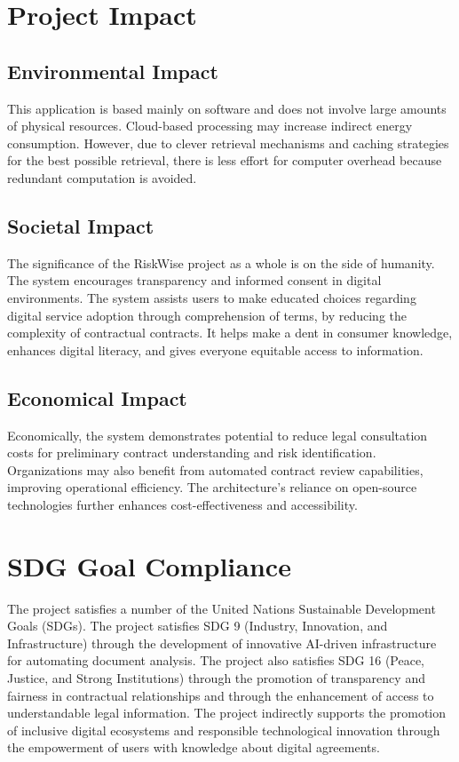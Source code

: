 \section{Project Impact}

\subsection{Environmental Impact}
This application is based mainly on software and does not involve
large amounts of physical resources. Cloud-based processing may
increase indirect energy consumption. However, due to clever
retrieval mechanisms and caching strategies for the best possible
retrieval, there is less effort for computer overhead because
redundant computation is avoided.

\subsection{Societal Impact}
The significance of the RiskWise project as a whole is on the side of
humanity. The system encourages transparency and informed consent in
digital environments. The system assists users to make educated
choices regarding digital service adoption through comprehension of
terms, by reducing the complexity of contractual contracts. It helps
make a dent in consumer knowledge, enhances digital literacy, and
gives everyone equitable access to information.

\subsection{Economical Impact}
Economically, the system demonstrates potential to reduce legal
consultation costs for preliminary contract understanding and risk
identification. Organizations may also benefit from automated
contract review capabilities, improving operational efficiency. The
architecture’s reliance on open-source technologies further enhances
cost-effectiveness and accessibility.

\section{SDG Goal Compliance}
The project satisfies a number of the United Nations Sustainable
Development Goals (SDGs). The project satisfies SDG 9 (Industry,
Innovation, and Infrastructure) through the development of innovative
AI-driven infrastructure for automating document analysis. The
project also satisfies SDG 16 (Peace, Justice, and Strong
Institutions) through the promotion of transparency and fairness in
contractual relationships and through the enhancement of access to
understandable legal information. The project indirectly supports the
promotion of inclusive digital ecosystems and responsible
technological innovation through the empowerment of users with
knowledge about digital agreements.

